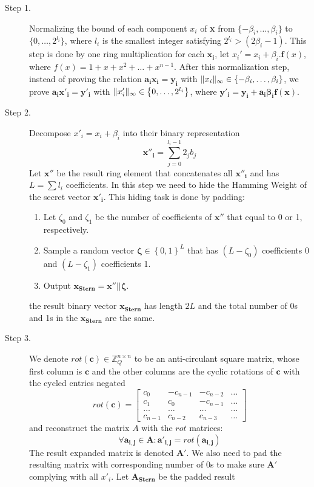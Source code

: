 \begin{description}
\item [Step 1.] Normalizing the bound of each component $x_i$ of \textbf{x} from $\{-\beta_i,\dots,\beta_i\}$ to
  $\{0,\dots,2^{l_i}\}$, where $l_i$ is the smallest integer satisfying $2^{l_i} > (2\beta_i -1)$. This step is done by
  one ring multiplication for each $\mathbf{x_i}$, let $x_i' = x_i + \beta_i.\mathbf{f}(x)$, where
  $f(x) = 1 + x + x^2 + \dots + x^{n-1}$. After this normalization step, instead of proving the relation
  $\mathbf{a_i x_i = y_i}$ with $\Vert x_i \Vert_{\infty} \in \left\{ -\beta_i, \dots, \beta_i \right\}$, we prove
  $\mathbf{a_i x'_i = y'_i}$ with $\Vert  x'_i  \Vert_{\infty} \in \left\{ 0,\dots,2^{l_i} \right\}$, where
  $\mathbf{y'_i = y_i + a_i\beta_i f(x)}$.

\item [Step 2.] Decompose $x'_i = x_i + \beta_i$ into their binary representation
  \[
    \mathbf{x''_i} = \sum_{j = 0}^{l_i -1}{2_j b_j}
  \]
  Let $\mathbf{x''}$ be the result ring element that concatenates all $\mathbf{x''_i}$ and has $L = \sum{l_i}$
  coefficients. In this step we need to hide the Hamming Weight of the secret vector $\mathbf{x'_i}$. This hiding task
  is done by padding:
  \begin{enumerate}
  \item Let $\zeta_0$ and $\zeta_1$ be the number of coefficients of $\mathbf{x''}$ that equal to 0 or 1, respectively.
  \item Sample a random vector $\mathbf{\zeta} \in \left\{ 0,1 \right\}^{L}$ that has $(L - \zeta_0)$ coefficients 0 and
    $(L - \zeta_1)$ coefficients 1.
  \item Output $\mathbf{x_{Stern}} = \mathbf{x''} || \mathbf{\zeta}$.
  \end{enumerate}
  the result binary vector $\mathbf{x_{Stern}}$ has length $2L$ and the total number of 0s and 1s in the
  $\mathbf{x_{Stern}}$ are the same.

\item [Step 3.] We denote $ rot({\textbf{c}}) \in \mathbb{Z}_Q^{n\times n}$ to be an anti-circulant square matrix, whose
  first column is $\mathbf{c}$ and the other columns are the cyclic rotations of $\mathbf{c}$ with the cycled entries
  negated
  \[
    rot({\mathbf{c}})=
    \begin{bmatrix}
      c_0 & -c_{n-1} & -c_{n-2} & \dots\\
      c_1 & c_0 & -c_{n-1} & \dots\\
      \dots & \dots & \dots & \dots\\
      c_{n-1} & c_{n-2} & c_{n-3} & \dots
    \end{bmatrix}
  \]
  and reconstruct the matrix $A$ with the $rot$ matrices:
  \[
    \forall \mathbf{a_{i,j}} \in \mathbf{A}: \mathbf{a'_{i,j}} =
    rot(\mathbf{a_{i,j}})
  \]
  The result expanded matrix is denoted $\mathbf{A'}$. We also need to pad the resulting matrix with corresponding
  number of 0s to make sure $\mathbf{A'}$ complying with all $x'_i$. Let $\mathbf{A_{Stern}}$ be the padded result


\end{description}
